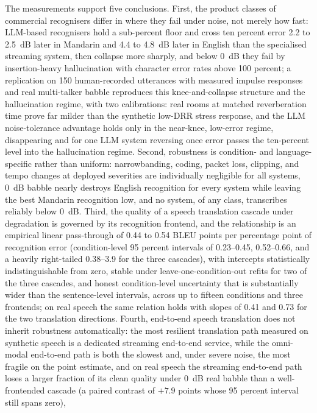 The measurements support five conclusions. First, the product classes of
commercial recognisers differ in where they fail under noise, not merely how
fast: LLM-based recognisers hold a sub-percent floor and cross ten percent
error 2.2 to 2.5~dB later in Mandarin and 4.4 to 4.8~dB later in English
than the specialised streaming system, then collapse more sharply, and below
0~dB they fail by insertion-heavy hallucination with character error rates
above 100 percent; a replication on 150 human-recorded utterances with
measured impulse responses and real multi-talker babble reproduces this
knee-and-collapse structure and the hallucination regime, with two
calibrations: real rooms at matched reverberation time prove far milder
than the synthetic low-DRR stress response, and the LLM noise-tolerance
advantage holds only in the near-knee, low-error regime, disappearing and
for one LLM system reversing once error passes the ten-percent level into
the hallucination regime. Second, robustness is
condition- and language-specific
rather than uniform: narrowbanding, coding, packet loss, clipping, and tempo
changes at deployed severities are individually negligible for all systems,
0~dB babble nearly destroys English recognition for every system while
leaving the best Mandarin recognition low, and no system, of any class,
transcribes reliably below 0~dB. Third, the quality of a speech translation
cascade under degradation is governed by its recognition frontend, and the
relationship is an empirical linear pass-through of 0.44 to 0.54
BLEU points per percentage point of recognition error (condition-level 95
percent intervals of 0.23--0.45, 0.52--0.66, and a heavily right-tailed
0.38--3.9 for the three cascades), with intercepts
statistically indistinguishable from zero, stable under leave-one-condition-out
refits for two of the three cascades, and honest condition-level
uncertainty that is substantially wider than the sentence-level intervals,
across up to fifteen conditions and three frontends; on real speech the
same relation holds with slopes of 0.41 and 0.73 for the two translation
directions. Fourth,
end-to-end speech translation does not inherit
robustness automatically: the most resilient translation path measured on
synthetic speech is a
dedicated streaming end-to-end service, while the omni-modal end-to-end
path is both the slowest and, under severe noise, the most fragile on the
point estimate, and on real
speech the streaming end-to-end path loses a larger fraction of its clean
quality under 0~dB real babble than a well-frontended cascade (a paired
contrast of $+7.9$ points whose 95 percent interval still spans zero),
